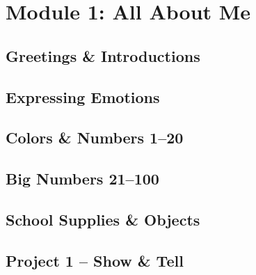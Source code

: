 


\coverpage{\TITLE}{\SUBTITLE}{\AUTHOR}{\DATE}{\SUBJECT}

\newpage
\tableofcontents

\clearpage
{}
\part{Module 1: All About Me}
\newpage
\chapter{Greetings \& Introductions}\label{ch:s01}

\newpage
\chapter{Expressing Emotions}\label{ch:s02}

\newpage
\chapter{Colors \& Numbers 1--20}\label{ch:s03}

\newpage
\chapter{Big Numbers 21--100}\label{ch:s04}

\newpage
\chapter{School Supplies \& Objects}\label{ch:s05}

\newpage
\chapter{Project 1 -- Show \& Tell}\label{ch:s06}


